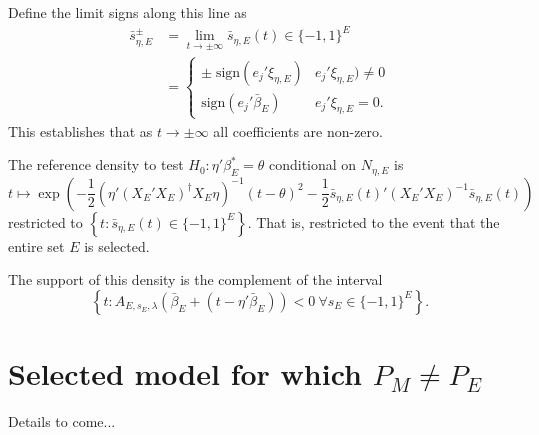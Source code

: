 \documentclass{article}
\newcommand{\OLS}{\bar{\beta}}
\begin{document}
        Define the limit signs along this line as
        $$
        \begin{aligned}
          \bar{s}^{\pm}_{\eta, E} &= \lim_{t \to \pm \infty} \bar{s}_{\eta, E}(t)  \in \{-1,1\}^E \\
          &= \begin{cases}
            \pm \; \text{sign} (e_j'\xi_{\eta,E}) & e_j'\xi_{\eta,E}) \neq 0 \\
            \text{sign}(e_j'\OLS_{E}) & e_j'\xi_{\eta,E}=0.
            \end{cases}
        \end{aligned}
        $$
        This establishes that as $t \to \pm \infty$ all coefficients are non-zero.

        The reference density to test $H_0:\eta'\beta_E^*=\theta$
        conditional on $N_{\eta, E}$ is 
        $$
        t \mapsto
        \exp\left(-\frac{1}{2}\left(\eta'(X_E'X_E)^{\dagger}X_E\eta\right)^{-1}(t-\theta)^2 - \frac{1}{2} \bar{s}_{\eta,E}(t)' (X_E'X_E)^{-1} \bar{s}_{\eta,E}(t)\right)
        $$
        restricted to $\left\{t: \bar{s}_{\eta,E}(t) \in \{-1,1\}^E\right\}$. That is,
        restricted to the event that the entire set $E$ is selected.

        The support of this density is the complement of the interval
        $$
        \left\{t: A_{E,s_E,\lambda}(\OLS_E + (t - \eta'\OLS_E)) < 0 \ \forall s_E \in \{-1,1\}^E \right\}.
        $$
        
        \section{Selected model for which $P_M \neq P_E$}

        Details to come...
\end{document}
